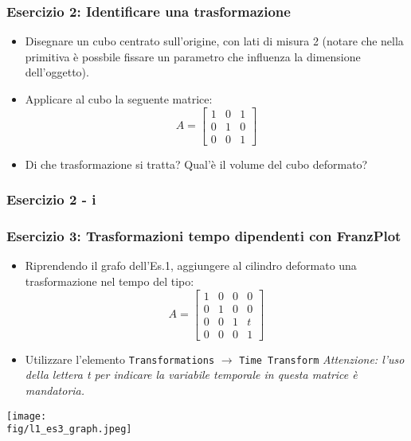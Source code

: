 \documentclass{beamer}
\newcommand{\fig}{figures}
\newcommand{\frnzplt}{FranzPlot }
\begin{document}
\begin{frame}
\frametitle{Esercizio 2: Identificare una trasformazione}
\begin{itemize}
\item Disegnare un  cubo centrato sull'origine, con lati di misura 2 (notare
che nella primitiva \`e possbile fissare un parametro che influenza la
dimensione dell'oggetto).  
\item Applicare al cubo la seguente matrice: 
\begin{displaymath}
A = \begin{bmatrix}
    1 & 0 & 1\\
    0 & 1 & 0\\
    0 & 0 & 1
    \end{bmatrix}
\end{displaymath}
\item Di che trasformazione si tratta? Qual'\`e il volume del cubo deformato?
\end{itemize}
\end{frame}
%
\begin{frame}
\frametitle{Esercizio 2 - i}
\begin{center}
\end{center}
\end{frame}
\begin{frame}
\frametitle{Esercizio 3: Trasformazioni tempo dipendenti con \frnzplt}
\begin{itemize}
\item Riprendendo il grafo dell'Es.1, aggiungere al cilindro deformato una trasformazione nel tempo del tipo:
\begin{displaymath}
A = \begin{bmatrix}
    1 & 0 & 0 & 0 \\
    0 & 1 & 0 & 0 \\
    0 & 0 & 1 & t \\
    0 & 0 & 0 & 1
    \end{bmatrix}
\end{displaymath}
\item Utilizzare l'elemento \texttt{Transformations} $\rightarrow$ \texttt{Time Transform} \textit{Attenzione: l'uso della lettera t per indicare la variabile temporale in questa matrice \`e mandatoria.}
\end{itemize}
\begin{center}
\texttt{[image: \\fig/l1\_es3\_graph.jpeg]}
\end{center}
\end{frame}
\end{document}
